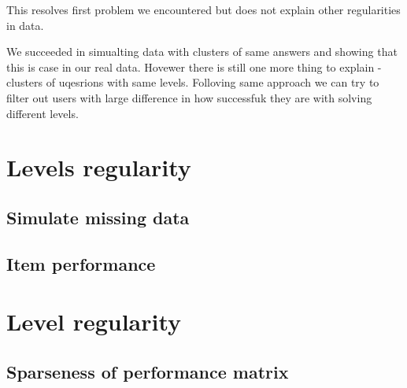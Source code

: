 \documentclass[
  digital, %
  table,   %
  nolof,     %
  nolot,     %
  nocover
]{fithesis3}
\begin{document}


This resolves first problem we encountered but does not explain other
regularities in data.

We succeeded in simualting data with clusters of same answers and
showing that this is case in our real data. Hovewer there is still one
more thing to explain - clusters of uqesrions with same levels.
Folloving same approach we can try to filter out users with large
difference in how successfuk they are with solving different levels.

\section{Levels regularity}

\subsection{Simulate missing data}





\subsection{Item performance}




















\section{Level regularity}\label{level-regularity}

\subsection{Sparseness of performance
matrix}\label{sparseness-of-performance-matrix}


\end{document}
